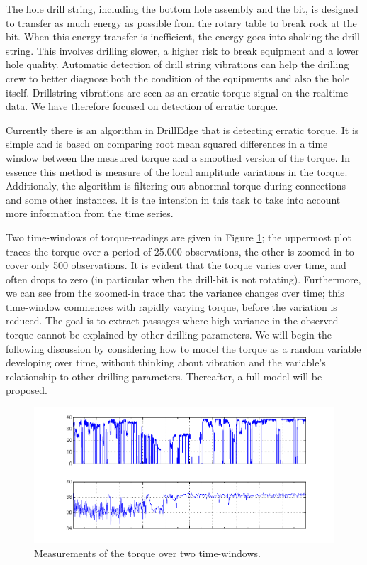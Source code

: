 The hole drill string, including the bottom hole assembly and the bit, is designed to transfer as much energy as possible from the rotary table to break rock at the bit.  When this energy transfer is inefficient, the energy goes into shaking the drill string.  This involves drilling slower, a higher risk to break equipment and a lower hole quality. Automatic detection of drill string vibrations can help the drilling crew to better diagnose both the condition of the equipments and also the hole itself. Drillstring vibrations are seen as an erratic torque signal on the realtime data.  We have therefore focused on detection of erratic torque.

Currently there is an algorithm in DrillEdge that is detecting erratic torque. It is simple and is based on comparing root mean squared differences in a time window between the measured torque and a smoothed version of the torque. In essence this method is measure of the local amplitude variations in the torque.  Additionaly, the algorithm is filtering out abnormal torque during connections and some other instances.  It is the intension in this task to take into account more information from the time series.

Two time-windows of torque-readings are given in Figure \ref{Figure:VTTorqueValues}; the uppermost plot traces the torque over a period of 25.000 observations, the other is zoomed in to cover only 500 observations. It is evident that the torque varies over time, and often drops to zero (in particular when the drill-bit is not rotating). Furthermore, we can see from the zoomed-in trace that the variance changes over time; this time-window commences with rapidly varying torque, before the variation is reduced. The goal is to extract passages where high variance in the observed torque cannot be explained by other drilling parameters. 
We will begin the following discussion by considering how to model the torque as a random variable developing over time, without thinking about vibration and the variable's relationship to other drilling parameters. Thereafter, a full model will be proposed.

\begin{figure}[ht!]
\begin{center}
\includegraphics[scale=0.3]{./figures/VT_TRQ_values} 
\caption{\label{Figure:VTTorqueValues} Measurements of the torque over two time-windows.}
\end{center}
\end{figure}

